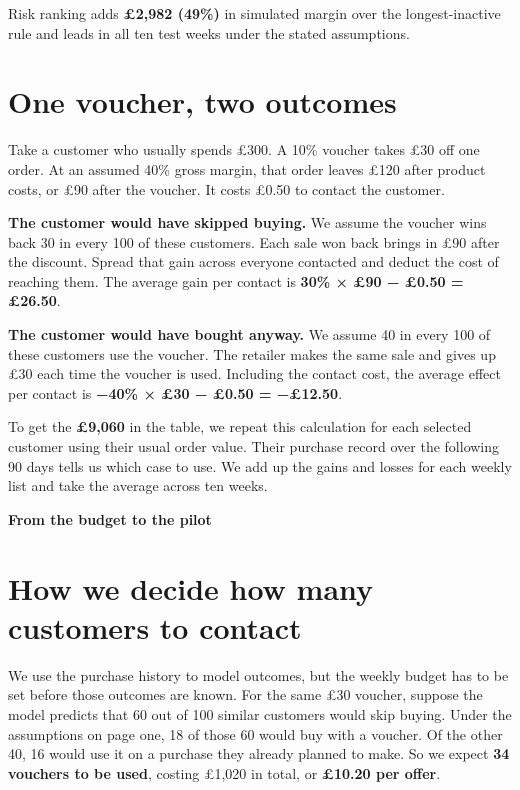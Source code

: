 \documentclass[a4paper,11pt]{article}
\begin{document}
Risk ranking adds \textbf{£2,982 (49\%)} in simulated margin over the longest-inactive rule and leads in all ten test weeks under the stated assumptions.

\section*{One voucher, two outcomes}
Take a customer who usually spends £300. A 10\% voucher takes £30 off one order. At an assumed 40\% gross margin, that order leaves £120 after product costs, or £90 after the voucher. It costs £0.50 to contact the customer.

\textbf{The customer would have skipped buying.} We assume the voucher wins back 30 in every 100 of these customers. Each sale won back brings in £90 after the discount. Spread that gain across everyone contacted and deduct the cost of reaching them. The average gain per contact is \textbf{30\% × £90 − £0.50 = £26.50}.

\textbf{The customer would have bought anyway.} We assume 40 in every 100 of these customers use the voucher. The retailer makes the same sale and gives up £30 each time the voucher is used. Including the contact cost, the average effect per contact is \textbf{−40\% × £30 − £0.50 = −£12.50}.

To get the \textbf{£9,060} in the table, we repeat this calculation for each selected customer using their usual order value. Their purchase record over the following 90 days tells us which case to use. We add up the gains and losses for each weekly list and take the average across ten weeks.

\newpage
{\fontsize{21}{25}\selectfont\bfseries\color{navy}From the budget to the pilot}\par
\vspace{0.14cm}{\color{navy}\hrule}\vspace{0.1cm}

\section*{How we decide how many customers to contact}
We use the purchase history to model outcomes, but the weekly budget has to be set before those outcomes are known. For the same £30 voucher, suppose the model predicts that 60 out of 100 similar customers would skip buying. Under the assumptions on page one, 18 of those 60 would buy with a voucher. Of the other 40, 16 would use it on a purchase they already planned to make. So we expect \textbf{34 vouchers to be used}, costing £1,020 in total, or \textbf{£10.20 per offer}.
\end{document}
